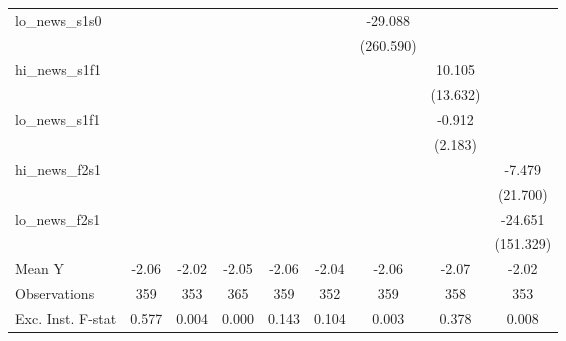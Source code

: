 {\begin{tabular}{l*{8}{c}}
\addlinespace
lo\_news\_s1s0&                     &                     &                     &                     &                     &     -29.088         &                     &                     \\
            &                     &                     &                     &                     &                     &   (260.590)         &                     &                     \\
\addlinespace
hi\_news\_s1f1&                     &                     &                     &                     &                     &                     &      10.105         &                     \\
            &                     &                     &                     &                     &                     &                     &    (13.632)         &                     \\
\addlinespace
lo\_news\_s1f1&                     &                     &                     &                     &                     &                     &      -0.912         &                     \\
            &                     &                     &                     &                     &                     &                     &     (2.183)         &                     \\
\addlinespace
hi\_news\_f2s1&                     &                     &                     &                     &                     &                     &                     &      -7.479         \\
            &                     &                     &                     &                     &                     &                     &                     &    (21.700)         \\
\addlinespace
lo\_news\_f2s1&                     &                     &                     &                     &                     &                     &                     &     -24.651         \\
            &                     &                     &                     &                     &                     &                     &                     &   (151.329)         \\
\midrule
Mean Y      &       -2.06         &       -2.02         &       -2.05         &       -2.06         &       -2.04         &       -2.06         &       -2.07         &       -2.02         \\
Observations&         359         &         353         &         365         &         359         &         352         &         359         &         358         &         353         \\
Exc. Inst. F-stat&       0.577         &       0.004         &       0.000         &       0.143         &       0.104         &       0.003         &       0.378         &       0.008         \\
\bottomrule
\end{tabular}
}
